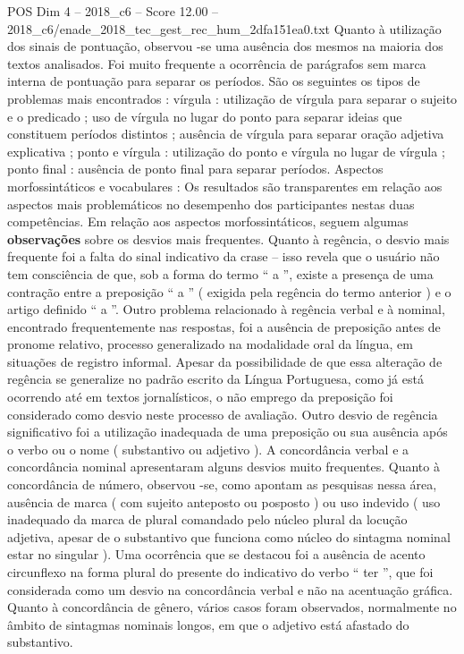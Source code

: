 \begin{textsample}{POS Dim 4 – 2018\_c6 – Score 12.00 – 2018\_c6/enade\_2018\_tec\_gest\_rec\_hum\_2dfa151ea0.txt}
Quanto à utilização dos sinais de pontuação, observou -se uma ausência dos mesmos na maioria dos textos analisados.
Foi muito frequente a ocorrência de parágrafos sem marca interna de pontuação para separar os períodos.
São os seguintes os tipos de problemas mais encontrados : vírgula : utilização de vírgula para separar o sujeito e o predicado ; uso de vírgula no lugar do ponto para separar ideias que constituem períodos distintos ; ausência de vírgula para separar oração adjetiva explicativa ; ponto e vírgula : utilização do ponto e vírgula no lugar de vírgula ; ponto final : ausência de ponto final para separar períodos.
Aspectos morfossintáticos e vocabulares : Os resultados são transparentes em relação aos aspectos mais problemáticos no desempenho dos participantes nestas duas competências.
Em relação aos aspectos morfossintáticos, seguem algumas \textbf{observações} sobre os desvios mais frequentes.
Quanto à regência, o desvio mais frequente foi a falta do sinal indicativo da crase – isso revela que o usuário não tem consciência de que, sob a forma do termo “ a ”, existe a presença de uma contração entre a preposição “ a ” ( exigida pela regência do termo anterior ) e o artigo definido “ a ”.
Outro problema relacionado à regência verbal e à nominal, encontrado frequentemente nas respostas, foi a ausência de preposição antes de pronome relativo, processo generalizado na modalidade oral da língua, em situações de registro informal.
Apesar da possibilidade de que essa alteração de regência se generalize no padrão escrito da Língua Portuguesa, como já está ocorrendo até em textos jornalísticos, o não emprego da preposição foi considerado como desvio neste processo de avaliação.
Outro desvio de regência significativo foi a utilização inadequada de uma preposição ou sua ausência após o verbo ou o nome ( substantivo ou adjetivo ).
A concordância verbal e a concordância nominal apresentaram alguns desvios muito frequentes.
Quanto à concordância de número, observou -se, como apontam as pesquisas nessa área, ausência de marca ( com sujeito anteposto ou posposto ) ou uso indevido ( uso inadequado da marca de plural comandado pelo núcleo plural da locução adjetiva, apesar de o substantivo que funciona como núcleo do sintagma nominal estar no singular ).
Uma ocorrência que se destacou foi a ausência de acento circunflexo na forma plural do presente do indicativo do verbo “ ter ”, que foi considerada como um desvio na concordância verbal e não na acentuação gráfica.
Quanto à concordância de gênero, vários casos foram observados, normalmente no âmbito de sintagmas nominais longos, em que o adjetivo está afastado do substantivo.

\end{textsample}
